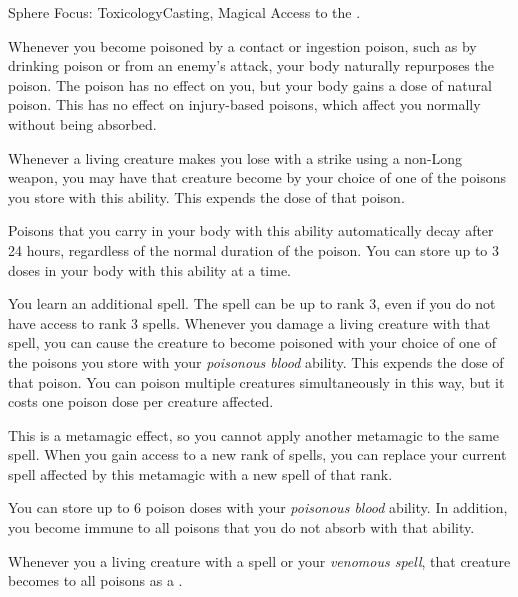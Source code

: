   \begin{magicalfeat}{Sphere Focus: Toxicology}{Casting, Magical}
    \featpre Access to the  .

     Whenever you become poisoned by a contact or ingestion poison, such as by drinking poison or from an enemy's attack, your body naturally repurposes the poison.
    The poison has no effect on you, but your body gains a dose of natural poison.
    This has no effect on injury-based poisons, which affect you normally without being absorbed.

    Whenever a living creature makes you lose  with a  strike using a non-Long weapon, you may have that creature become  by your choice of one of the poisons you store with this ability.
    This expends the dose of that poison.

    Poisons that you carry in your body with this ability automatically decay after 24 hours, regardless of the normal duration of the poison.
    You can store up to 3 doses in your body with this ability at a time.

     You learn an additional spell.
    The spell can be up to rank 3, even if you do not have access to rank 3 spells.
    Whenever you damage a living creature with that spell, you can cause the creature to become poisoned with your choice of one of the poisons you store with your \textit{poisonous blood} ability.
    This expends the dose of that poison.
    You can poison multiple creatures simultaneously in this way, but it costs one poison dose per creature affected.

    This is a metamagic effect, so you cannot apply another metamagic to the same spell.
    When you gain access to a new rank of spells, you can replace your current spell affected by this metamagic with a new spell of that rank.

     You can store up to 6 poison doses with your \textit{poisonous blood} ability.
    In addition, you become immune to all poisons that you do not absorb with that ability.

     Whenever you  a living creature with a  spell or your \textit{venomous spell}, that creature becomes \vulnerable to all poisons as a .
  \end{magicalfeat}

